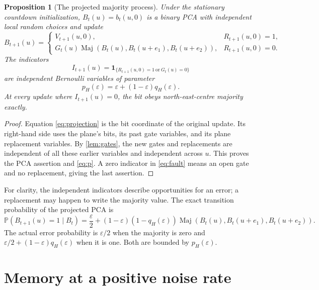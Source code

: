 \documentclass[11pt]{article}
\theoremstyle{plain}
\newtheorem{proposition}[theorem]{Proposition}
\theoremstyle{definition}
\theoremstyle{remark}
\newcommand{\Prob}{\mathbb P}
\newcommand{\eps}{\varepsilon}
\newcommand{\Maj}{\operatorname{Maj}}
\newcommand{\ind}{\mathbf 1}
\begin{document}
\begin{proposition}[The projected majority process]\label{prop:projection}
Under the stationary countdown initialization, $B_t(u)=b_t(u,0)$ is a binary PCA with independent local random choices and update
\begin{equation}\label{eq:projection}
 B_{t+1}(u)=
 \begin{cases}
 V_{t+1}(u,0),&R_{t+1}(u,0)=1,\\
 G_t(u)\Maj(B_t(u),B_t(u+e_1),B_t(u+e_2)),&R_{t+1}(u,0)=0.
 \end{cases}
\end{equation}
The indicators
\begin{equation}\label{eq:fault}
 I_{t+1}(u)=\ind_{\{R_{t+1}(u,0)=1\ \mathrm{or}\ G_t(u)=0\}}
\end{equation}
are independent Bernoulli variables of parameter
\begin{equation}\label{eq:p}
 p_H(\eps)=\eps+(1-\eps)q_H(\eps).
\end{equation}
At every update where $I_{t+1}(u)=0$, the bit obeys north-east-centre majority exactly.
\end{proposition}
\begin{proof}
Equation \eqref{eq:projection} is the bit coordinate of the original update. Its right-hand side uses the plane's bits, its past gate variables, and its plane replacement variables. By \cref{lem:gates}, the new gates and replacements are independent of all these earlier variables and independent across $u$. This proves the PCA assertion and \eqref{eq:p}. A zero indicator in \eqref{eq:fault} means an open gate and no replacement, giving the last assertion.
\end{proof}

For clarity, the independent indicators describe opportunities for an error; a replacement may happen to write the majority value. The exact transition probability of the projected PCA is
\begin{equation}\label{eq:kernel}
 \Prob(B_{t+1}(u)=1\mid B_t)
 =\frac{\eps}{2}+(1-\eps)(1-q_H(\eps))
  \Maj(B_t(u),B_t(u+e_1),B_t(u+e_2)).
\end{equation}
The actual error probability is $\eps/2$ when the majority is zero and $\eps/2+(1-\eps)q_H(\eps)$ when it is one. Both are bounded by $p_H(\eps)$.

\section{Memory at a positive noise rate}\label{sec:memory}
\end{document}
